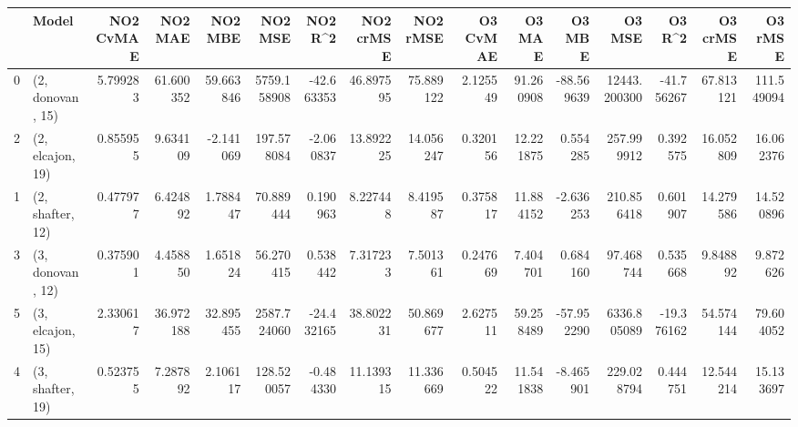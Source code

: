 \begin{tabular}{llrrrrrrrrrrrrrr}
\toprule
{} &             Model &  NO2 CvMAE &    NO2 MAE &    NO2 MBE &      NO2 MSE &    NO2 R\textasciicircum2 &  NO2 crMSE &   NO2 rMSE &  O3 CvMAE &     O3 MAE &     O3 MBE &        O3 MSE &     O3 R\textasciicircum2 &   O3 crMSE &     O3 rMSE \\
\midrule
0 &  (2, donovan, 15) &   5.799283 &  61.600352 &  59.663846 &  5759.158908 & -42.663353 &  46.897595 &  75.889122 &  2.125549 &  91.260908 & -88.569639 &  12443.200300 & -41.756267 &  67.813121 &  111.549094 \\
2 &  (2, elcajon, 19) &   0.855955 &   9.634109 &  -2.141069 &   197.578084 &  -2.060837 &  13.892225 &  14.056247 &  0.320156 &  12.221875 &   0.554285 &    257.999912 &   0.392575 &  16.052809 &   16.062376 \\
1 &  (2, shafter, 12) &   0.477977 &   6.424892 &   1.788447 &    70.889444 &   0.190963 &   8.227448 &   8.419587 &  0.375817 &  11.884152 &  -2.636253 &    210.856418 &   0.601907 &  14.279586 &   14.520896 \\
3 &  (3, donovan, 12) &   0.375901 &   4.458850 &   1.651824 &    56.270415 &   0.538442 &   7.317233 &   7.501361 &  0.247669 &   7.404701 &   0.684160 &     97.468744 &   0.535668 &   9.848892 &    9.872626 \\
5 &  (3, elcajon, 15) &   2.330617 &  36.972188 &  32.895455 &  2587.724060 & -24.432165 &  38.802231 &  50.869677 &  2.627511 &  59.258489 & -57.952290 &   6336.805089 & -19.376162 &  54.574144 &   79.604052 \\
4 &  (3, shafter, 19) &   0.523755 &   7.287892 &   2.106117 &   128.520057 &  -0.484330 &  11.139315 &  11.336669 &  0.504522 &  11.541838 &  -8.465901 &    229.028794 &   0.444751 &  12.544214 &   15.133697 \\
\bottomrule
\end{tabular}
